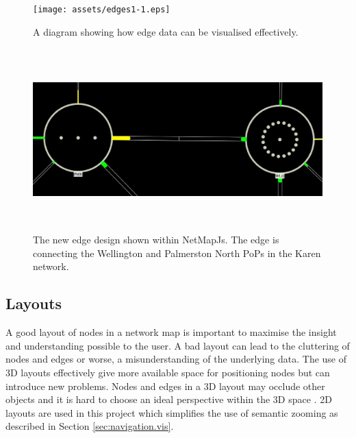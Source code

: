 \documentclass[11pt, a4paper]{article}
\begin{document}
\begin{figure}
\centering
\texttt{[image: assets/edges1-1.eps]}
\caption{A diagram showing how edge data can be visualised effectively.}
\label{fig:edges1.1}
\end{figure}

\begin{figure}
\centering
\includegraphics[width=170mm,height=70.21mm]{assets/edges1-2.eps}
\caption{The new edge design shown within NetMapJs. The edge is connecting the
Wellington and Palmerston North PoPs in the Karen network.}
\label{fig:edges1.2}
\end{figure}

\subsection{Layouts}
\label{sec:layouts.vis}

% 

% 

A good layout of nodes in a network map is important to maximise the insight and
understanding possible to the user. A bad layout can lead to the cluttering of
nodes and edges or worse, a misunderstanding of the underlying data. The use of
3D layouts effectively give more available space for positioning nodes but can
introduce new problems. Nodes and edges in a 3D layout may occlude other objects
and it is hard to choose an ideal perspective within the 3D space
\cite{Lai_1998}. 2D layouts are used in this project which simplifies the use of
semantic zooming as described in Section \ref{sec:navigation.vis}. 
\end{document}
